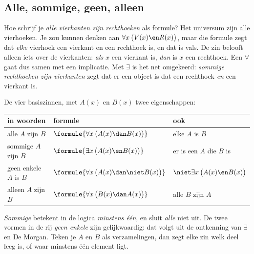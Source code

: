 \subsection{Alle, sommige, geen, alleen}

Hoe schrijf je \textit{alle vierkanten zijn rechthoeken} als formule? Het universum zijn alle vierhoeken. Je zou kunnen denken aan $\forall x\, \bigl(V(x) \en R(x)\bigr)$, maar die formule zegt dat \textit{elke} vierhoek een vierkant en een rechthoek is, en dat is vals. De zin belooft alleen iets over de vierkanten: \textit{als} $x$ een vierkant is, \textit{dan} is $x$ een rechthoek. Een $\forall$ gaat dus samen met een implicatie. Met $\exists$ is het net omgekeerd: \textit{sommige rechthoeken zijn vierkanten} zegt dat er een object is dat een rechthoek \textit{en} een vierkant is.

\begin{theorie}
De vier basiszinnen, met $A(x)$ en $B(x)$ twee eigenschappen:

\vspace{1mm}
{\centering{}\renewcommand{\arraystretch}{1.45}%
\begin{tabular}{|>{\centering\arraybackslash}m{3.6cm}|>{\centering\arraybackslash}m{5.4cm}|>{\centering\arraybackslash}m{3.6cm}|}
\hline
\textbf{in woorden} & \textbf{formule} & \textbf{ook} \\ \hline
alle $A$ zijn $B$ & $\formule{\forall x\, \bigl(A(x) \dan B(x)\bigr)}$ & elke $A$ is $B$ \\ \hline
sommige $A$ zijn $B$ & $\formule{\exists x\, \bigl(A(x) \en B(x)\bigr)}$ & er is een $A$ die $B$ is \\ \hline
geen enkele $A$ is $B$ & $\formule{\forall x\, \bigl(A(x) \dan \niet B(x)\bigr)}$ & $\niet\exists x\, \bigl(A(x) \en B(x)\bigr)$ \\ \hline
alleen $A$ zijn $B$ & $\formule{\forall x\, \bigl(B(x) \dan A(x)\bigr)}$ & alle $B$ zijn $A$ \\ \hline
\end{tabular}\par}
\end{theorie}

\textit{Sommige} betekent in de logica \textit{minstens één}, en sluit \textit{alle} niet uit. De twee vormen in de rij \textit{geen enkele} zijn gelijkwaardig: dat volgt uit de ontkenning van $\exists$ en De Morgan. Teken je $A$ en $B$ als verzamelingen, dan zegt elke zin welk deel leeg is, of waar minstens één element ligt.

